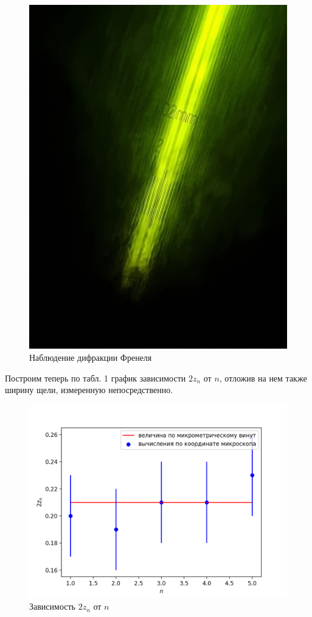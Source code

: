 \documentclass[a4paper,12pt]{article}
\begin{document}
\begin{figure}[H]
    \centering
    \includegraphics[scale=0.2]{pic_1.png}
    \caption{Наблюдение дифракции Френеля}
\end{figure}

\noindent
Построим теперь по табл. 1 график зависимости $2z_n$ от $n$, отложив на нем также ширину щели, измеренную непосредственно.

\begin{figure}[H]
    \centering
    \includegraphics[scale=0.9]{1.png}
    \caption{Зависимость $2z_n$ от $n$}
\end{figure}
\end{document}
